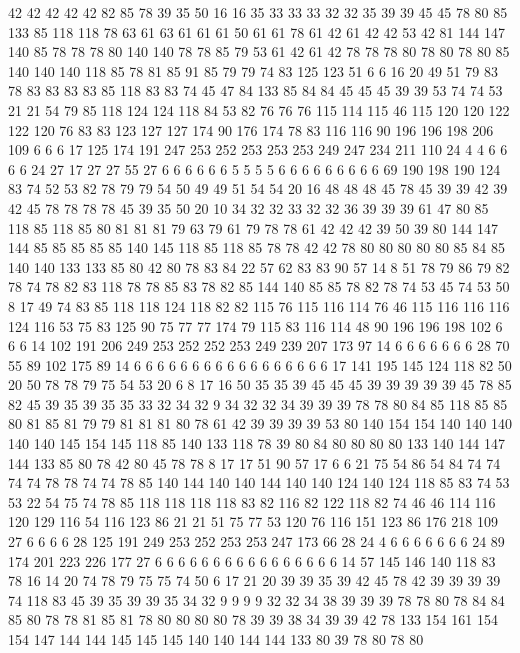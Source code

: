 42 42 42 42 42 82 85 78 39 35 50 16 16 35 33 33 33 32 32 35
39 39 45 45 78 80 85 133 85 118 118 78 63 61 63 61 61 61 50 61
61 78 61 42 61 42 42 53 42 81 144 147 140 85 78 78 78 80 140 140
78 78 85 79 53 61 42 61 42 78 78 78 80 78 80 78 80 85 140 140
140 118 85 78 81 85 91 85 79 79 74 83 125 123 51 6 6 16 20 49
51 79 83 78 83 83 83 83 85 118 83 83 74 45 47 84 133 85 84 84
45 45 45 39 39 53 74 74 53 21 21 54 79 85 118 124 124 118 84 53
82 76 76 76 115 114 115 46 115 120 120 122 122 120 76 83 83 123 127 127
174 90 176 174 78 83 116 116 90 196 196 198 206 109 6 6 6 17 125 174
191 247 253 252 253 253 253 249 247 234 211 110 24 4 4 6 6 6 6 24
27 17 27 27 55 27 6 6 6 6 6 6 5 5 5 5 6 6 6 6
6 6 6 6 6 69 190 198 190 124 83 74 52 53 82 78 79 79 54 50
49 49 51 54 54 20 16 48 48 48 45 78 45 39 39 42 39 42 45 78
78 78 78 45 39 35 50 20 10 34 32 32 33 32 32 36 39 39 39 61
47 80 85 118 85 118 85 80 81 81 81 79 63 79 61 79 78 78 61 42
42 42 39 50 39 80 144 147 144 85 85 85 85 85 140 145 118 85 118 85
78 78 42 42 78 80 80 80 80 80 85 84 85 140 140 133 133 85 80 42
80 78 83 84 22 57 62 83 83 90 57 14 8 51 78 79 86 79 82 78
74 78 82 83 118 78 78 85 83 78 82 85 144 140 85 85 78 82 78 74
53 45 74 53 50 8 17 49 74 83 85 118 118 124 118 82 82 115 76 115
116 114 76 46 115 116 116 116 124 116 53 75 83 125 90 75 77 77 174 79
115 83 116 114 48 90 196 196 198 102 6 6 6 14 102 191 206 249 253 252
252 253 249 239 207 173 97 14 6 6 6 6 6 6 6 28 70 55 89 102
175 89 14 6 6 6 6 6 6 6 6 6 6 6 6 6 6 6 6 6
17 141 195 145 124 118 82 50 20 50 78 78 79 75 54 53 20 6 8 17
16 50 35 35 39 45 45 45 39 39 39 39 39 45 78 85 82 45 39 35
39 35 35 33 32 34 32 9 34 32 32 34 39 39 39 78 78 80 84 85
118 85 85 80 81 85 81 79 79 81 81 81 80 78 61 42 39 39 39 39
53 80 140 154 154 140 140 140 140 140 145 154 145 118 85 140 133 118 78 39
80 84 80 80 80 80 133 140 144 147 144 133 85 80 78 42 80 45 78 78
8 17 17 51 90 57 17 6 6 21 75 54 86 54 84 74 74 74 74 78
78 74 74 78 85 140 144 140 140 144 140 140 124 140 124 118 85 83 74 53
53 22 54 75 74 78 85 118 118 118 118 83 82 116 82 122 118 82 74 46
46 114 116 120 129 116 54 116 123 86 21 21 51 75 77 53 120 76 116 151
123 86 176 218 109 27 6 6 6 6 28 125 191 249 253 252 253 253 247 173
66 28 24 4 6 6 6 6 6 6 6 24 89 174 201 223 226 177 27 6
6 6 6 6 6 6 6 6 6 6 6 6 6 6 6 14 57 145 146 140
118 83 78 16 14 20 74 78 79 75 75 74 50 6 17 21 20 39 39 35
39 42 45 78 42 39 39 39 39 74 118 83 45 39 35 39 39 35 34 32
9 9 9 9 32 32 34 38 39 39 39 78 78 80 78 84 84 85 80 78
78 81 85 81 78 80 80 80 80 78 39 39 38 34 39 39 42 78 133 154
161 154 154 147 144 144 145 145 145 140 140 144 144 133 80 39 78 80 78 80
